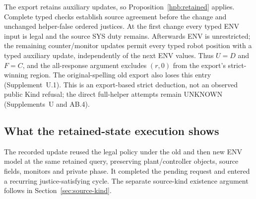 The export retains auxiliary updates, so Proposition~\ref{hpb:retained}
applies. Complete typed checks establish source agreement before the change
and unchanged helper-false ordered justices. At the first change every typed
ENV input is legal and the source SYS duty remains. Afterwards ENV is
unrestricted; the remaining counter/monitor updates permit every typed robot
position with a typed auxiliary update, independently of the next ENV values.
Thus $U=D$ and $F=C$, and the all-response argument excludes $(r,0)$ from
the export's strict-winning region. The original-spelling old export also
loses this entry (Supplement~U.1). This is an export-based strict deduction, not an observed public Kind
refusal; the direct full-helper attempts remain UNKNOWN (Supplements~U and AB.4).

\subsection{What the retained-state execution shows}
The recorded update reused the legal policy under the old and then new
ENV model at the same retained query, preserving plant/controller objects,
source fields, monitors and private phase. It completed the pending request
and entered a recurring justice-satisfying cycle. The separate source-kind
existence argument follows in Section~\ref{sec:source-kind}.
